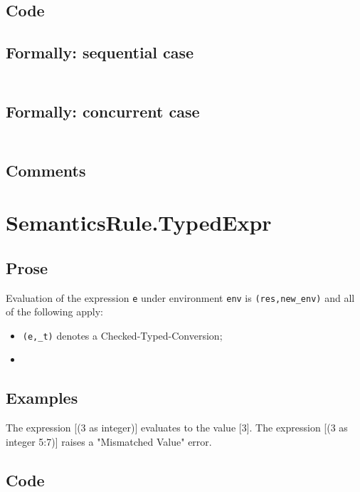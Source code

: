 \documentclass{book}
\begin{document}
  \subsection{Code}

  \subsection{Formally: sequential case}
  \begin{align}
  \end{align} 

  \subsection{Formally: concurrent case}
  \begin{align}
  \end{align} 

  \subsection{Comments}

\section{SemanticsRule.TypedExpr \label{sec:SemanticsRule.TypedExpr}}

  \subsection{Prose}
  Evaluation of the expression \texttt{e} under environment \texttt{env} is
  \texttt{(res,new\_env)} and all of the following apply:
  \begin{itemize}
  \item \texttt{(e,\_t)} denotes a Checked-Typed-Conversion;
  \item 
  \end{itemize} 

  \subsection{Examples}
  The expression [(3 as integer)] evaluates to the value [3].
  The expression [(3 as integer {5:7})] raises a "Mismatched Value" error.

  \subsection{Code}
\end{document}
